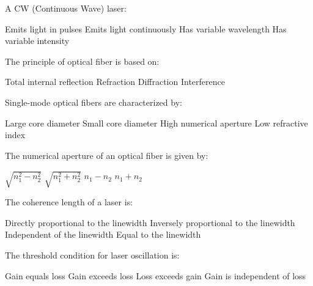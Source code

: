 \begin{question}[2]
A CW (Continuous Wave) laser:

\begin{oneparcheckboxes}
\choice Emits light in pulses
\correctchoice Emits light continuously
\choice Has variable wavelength
\choice Has variable intensity
\end{oneparcheckboxes}
\end{question}

\begin{question}[2]
The principle of optical fiber is based on:

\begin{oneparcheckboxes}
\correctchoice Total internal reflection
\choice Refraction
\choice Diffraction
\choice Interference
\end{oneparcheckboxes}
\end{question}

\begin{question}[2]
Single-mode optical fibers are characterized by:

\begin{oneparcheckboxes}
\choice Large core diameter
\correctchoice Small core diameter
\choice High numerical aperture
\choice Low refractive index
\end{oneparcheckboxes}
\end{question}

\begin{question}[2]
The numerical aperture of an optical fiber is given by:

\begin{oneparcheckboxes}
\correctchoice $\displaystyle \sqrt{n_1^2 - n_2^2}$
\choice $\displaystyle \sqrt{n_1^2 + n_2^2}$
\choice $\displaystyle n_1 - n_2$
\choice $\displaystyle n_1 + n_2$
\end{oneparcheckboxes}
\end{question}

\begin{question}[2]
The coherence length of a laser is:

\begin{oneparcheckboxes}
\choice Directly proportional to the linewidth
\correctchoice Inversely proportional to the linewidth
\choice Independent of the linewidth
\choice Equal to the linewidth
\end{oneparcheckboxes}
\end{question}

\begin{question}[2]
The threshold condition for laser oscillation is:

\begin{oneparcheckboxes}
\choice Gain equals loss
\correctchoice Gain exceeds loss
\choice Loss exceeds gain
\choice Gain is independent of loss
\end{oneparcheckboxes}
\end{question}

